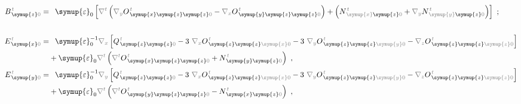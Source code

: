 \begin{subequations}
\begin{align}
	B^{\;\!\mathcolor{gray}{t}}_{\;\! \symup{z} \mathcolor{gray}{0}} = &\hphantom{+} {\symup{\varepsilon}}_0 \left[ \mathcolor{gray}{\nabla^t} \left( \mathcolor{gray}{\nabla_y}
	O^{\;\!\mathcolor{gray}{t}}_{\;\! \symup{x}\symup{z}\symup{z} \mathcolor{gray}{0}} - \mathcolor{gray}{\nabla_x}
	O^{\;\!\mathcolor{gray}{t}}_{\;\! \symup{y}\symup{z}\symup{z}\mathcolor{gray}{0}} \right) + \left( 
	N^{\;\!\mathcolor{gray}{t}}_{\;\! \mathcolor{gray}{\symup{x}} \symup{z} \mathcolor{gray}{0}} + \mathcolor{gray}{\nabla_y} N^{\;\!\mathcolor{gray}{t}}_{\;\! \mathcolor{gray}{\symup{y}} \symup{z} \mathcolor{gray}{0}} \right) \right]~; \label{eq:B_z0=} \\[1.7em]
	E^{\;\!\mathcolor{gray}{t}}_{\;\! \symup{x}\mathcolor{gray}{0}} = &\hphantom{+} {\symup{\varepsilon}}_0^{-1} \mathcolor{gray}{\nabla_x} \left[ Q^{\;\!\mathcolor{gray}{t}}_{\;\! \symup{z} \symup{z} \mathcolor{gray}{0}} - 3~ \mathcolor{gray}{\nabla_x} O^{\;\!\mathcolor{gray}{t}}_{\;\! \symup{z} \symup{z} \mathcolor{gray}{\symup{x}} \mathcolor{gray}{0}} - 3~ \mathcolor{gray}{\nabla_y}  O^{\;\!\mathcolor{gray}{t}}_{\;\! \symup{z} \symup{z} \mathcolor{gray}{\symup{y}} \mathcolor{gray}{0}} - \mathcolor{gray}{\nabla_z}  O^{\;\!\mathcolor{gray}{t}}_{\;\! \symup{z} \symup{z} \mathcolor{gray}{\symup{z}} \mathcolor{gray}{0}} \right] \label{eq:E_x0=} \\ &+ {\symup{\varepsilon}}_0 \mathcolor{gray}{\nabla^t} \left( \mathcolor{gray}{\nabla^t} O^{\;\!\mathcolor{gray}{t}}_{\;\!\symup{x} \symup{z} \symup{z} \mathcolor{gray}{0}} + N^{\;\!\mathcolor{gray}{t}}_{\;\! \symup{y} \symup{z} \mathcolor{gray}{0}} \right) ~, \\ E^{\;\!\mathcolor{gray}{t}}_{\;\! \symup{y}\mathcolor{gray}{0}} = &\hphantom{+} {\symup{\varepsilon}}_0^{-1} \mathcolor{gray}{\nabla_y} \left[ Q^{\;\!\mathcolor{gray}{t}}_{\;\! \symup{z} \symup{z} \mathcolor{gray}{0}} - 3~ \mathcolor{gray}{\nabla_x} O^{\;\!\mathcolor{gray}{t}}_{\;\! \symup{z} \symup{z} \mathcolor{gray}{\symup{x}} \mathcolor{gray}{0}} - 3~ \mathcolor{gray}{\nabla_y}  O^{\;\!\mathcolor{gray}{t}}_{\;\! \symup{z} \symup{z} \mathcolor{gray}{\symup{y}} \mathcolor{gray}{0}} - \mathcolor{gray}{\nabla_z}  O^{\;\!\mathcolor{gray}{t}}_{\;\! \symup{z} \symup{z} \mathcolor{gray}{\symup{z}} \mathcolor{gray}{0}} \right] \label{eq:E_y0=} \\ &+ {\symup{\varepsilon}}_0 \mathcolor{gray}{\nabla^t} \left( \mathcolor{gray}{\nabla^t} O^{\;\!\mathcolor{gray}{t}}_{\;\! \symup{y} \symup{z} \symup{z} \mathcolor{gray}{0}} - N^{\;\!\mathcolor{gray}{t}}_{\;\! \symup{x} \symup{z} \mathcolor{gray}{0}} \right) ~, \\

\end{align}
\end{subequations}
